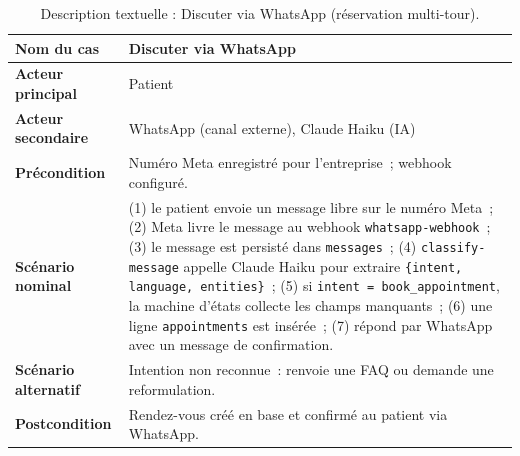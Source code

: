 \begin{table}[H]
  \centering\small
  \caption{Description textuelle : Discuter via WhatsApp (réservation multi-tour).}
  \label{tab:uc-s1-chat}
  \renewcommand{\arraystretch}{1.45}
  \begin{tabular}{|p{3.0cm}|>{\raggedright\arraybackslash}p{10.8cm}|}
    \hline\hline
    \textbf{Nom du cas} & Discuter via WhatsApp \\
    \hline
    \textbf{Acteur principal} & Patient \\
    \hline
    \textbf{Acteur secondaire} & WhatsApp (canal externe), Claude Haiku (IA) \\
    \hline
    \textbf{Précondition} & Numéro Meta enregistré pour l'entreprise~;
      webhook configuré. \\
      \hline
    \textbf{Scénario nominal} &
      (1) le patient envoie un message libre sur le numéro Meta~;
      (2) Meta livre le message au webhook \texttt{whatsapp-webhook}~;
      (3) le message est persisté dans \texttt{messages}~;
      (4) \texttt{classify-message} appelle Claude Haiku pour extraire
          \texttt{\{intent, language, entities\}}~;
      (5) si \texttt{intent = book\_appointment}, la machine d'états
          collecte les champs manquants~;
      (6) une ligne \texttt{appointments} est insérée~;
      (7) \nova{} répond par WhatsApp avec un message de confirmation. \\
      \hline
    \textbf{Scénario alternatif} & Intention non reconnue~: \nova{}
      renvoie une FAQ ou demande une reformulation. \\
      \hline
    \textbf{Postcondition} & Rendez-vous créé en base et confirmé
      au patient via WhatsApp. \\
    \hline\hline
  \end{tabular}
\end{table}

